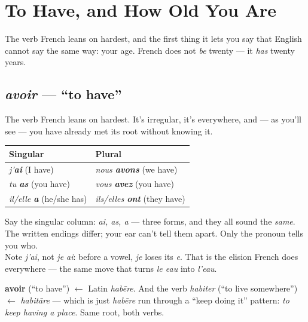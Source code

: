 \chapter{To Have, and How Old You Are}
\label{ch:avoir-age}

The verb French leans on hardest, and the first thing it lets you say that
English cannot say the same way: your age. French does not \emph{be} twenty ---
it \emph{has} twenty years.

\section{\emph{avoir} --- ``to have''}
\label{lesson:avoir}

The verb French leans on hardest. It's irregular, it's everywhere, and --- as
you'll see --- you have already met its root without knowing it.

\begin{center}
\begin{tabular}{@{}ll@{}}
\toprule
Singular & Plural \\
\midrule
\emph{j'\textbf{ai}} (I have) & \emph{nous \textbf{avons}} (we have) \\
\emph{tu \textbf{as}} (you have) & \emph{vous \textbf{avez}} (you have) \\
\emph{il/elle \textbf{a}} (he/she has) & \emph{ils/elles \textbf{ont}} (they have) \\
\bottomrule
\end{tabular}
\end{center}

\begin{sounds}
Say the singular column: \emph{ai, as, a} --- three forms, and they all sound
the \emph{same}. The written endings differ; your ear can't tell them apart.
Only the pronoun tells you who.\\[3pt]
Note \emph{j'ai}, not \emph{je ai}: before a vowel, \emph{je} loses its
\emph{e}. That is the elision French does everywhere --- the same move that
turns \emph{le eau} into \emph{l'eau}.
\end{sounds}

\begin{cousinweb}
\textbf{avoir} (``to have'') $\leftarrow$ Latin \emph{hab\=ere}. And the verb
\emph{habiter} (``to live somewhere'') $\leftarrow$ \emph{habit\=are} --- which
is just \emph{hab\=ere} run through a ``keep doing it'' pattern: \emph{to keep
having a place}. Same root, both verbs.
\end{cousinweb}

